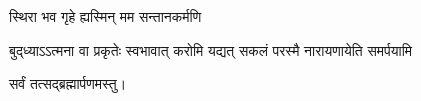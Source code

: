 {स्थिरा भव गृहे ह्यस्मिन् मम सन्तानकर्मणि}

{बुद्‌ध्याऽऽत्मना वा प्रकृतेः स्वभावात्}
{करोमि यद्यत् सकलं परस्मै}
{नारायणायेति समर्पयामि}

\centerline{सर्वं तत्सद्ब्रह्मार्पणमस्तु।}

\closesub


\closesection
